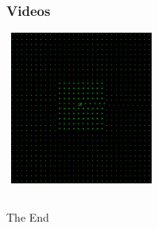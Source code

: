 \documentclass[xcolor={dvipsnames}]{beamer}
\begin{document}

\begin{frame}
\frametitle{Videos}
\centerline{\includegraphics[width=5cm, height=5cm]{images/startvideo.png}}
\vspace{.75cm}
\begin{columns}[c] %
\centerline{}
\centerline{}
\end{columns}
\end{frame}


\begin{frame}
\Huge{\centerline{The End}}
\end{frame}

\end{document}
